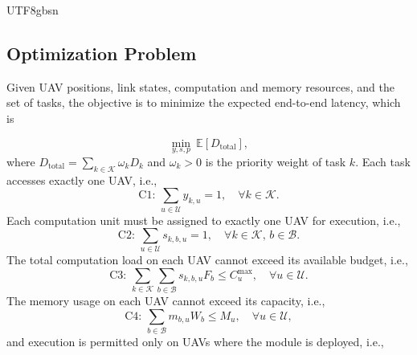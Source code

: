 \documentclass[journal]{IEEEtran}
\begin{document}
\begin{CJK*}{UTF8}{gbsn}
\subsection{Optimization Problem}

Given UAV positions, link states, computation and memory resources, and the set of tasks, the objective is to minimize the expected end-to-end latency, which is 

\begin{equation}\label{e16}
\min_{y,s,p} \ \mathbb{E}\left[D_{\mathrm{total}} \right],
\end{equation}
where \( D_{\mathrm{total}} = \sum_{k \in \mathcal{K}} \omega_k D_k \) and \(\omega_k > 0\) is the priority weight of task \(k\). Each task accesses exactly one UAV, i.e., 
\begin{equation}
\text{C1: } \sum_{u \in \mathcal{U}} y_{k,u} = 1, \quad \forall k \in \mathcal{K}.
\end{equation}
Each computation unit must be assigned to exactly one UAV for execution, i.e.,
\begin{equation}
\text{C2: } \sum_{u \in \mathcal{U}} s_{k,b,u} = 1, \quad \forall k \in \mathcal{K}, \, b \in \mathcal{B}.
\end{equation}
The total computation load on each UAV cannot exceed its available budget, i.e.,
\begin{equation}
\text{C3: } \sum_{k \in \mathcal{K}} \sum_{b \in \mathcal{B}} s_{k,b,u} F_b \le C_u^{\max}, \quad \forall u \in \mathcal{U}.
\end{equation}
The memory usage on each UAV cannot exceed its capacity, i.e.,
\begin{equation}
\text{C4: } \sum_{b \in \mathcal{B}} m_{b,u} W_b \le M_u, \quad \forall u \in \mathcal{U},
\end{equation}
and execution is permitted only on UAVs where the module is deployed, i.e.,
\begin{equation}

\end{equation}
\end{CJK*}
\end{document}
